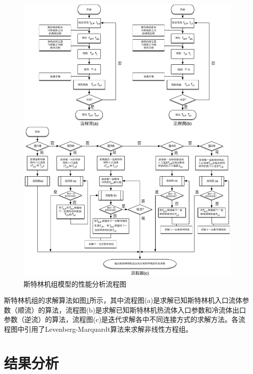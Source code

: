 \noindent \begin{figure}[htbp]
\begin{center}
	\includegraphics[width = 1.0\columnwidth]{fig/FlowChart}
	\caption{斯特林机组模型的性能分析流程图}
	\label{fig:Flowchart}
\end{center}
\end{figure}

斯特林机组的求解算法如图\ref{fig:Flowchart}所示，其中流程图(a)是求解已知斯特林机入口流体参数（顺流）的算法，流程图(b)是求解已知斯特林机热流体入口参数和冷流体出口参数（逆流）的算法，流程图(c)是迭代求解各中不同连接方式的求解方法。各流程图中引用了Levenberg-Marquardt算法来求解非线性方程组。

\section{结果分析}

